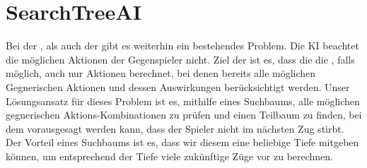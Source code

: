 \section{SearchTreeAI}
\label{sec:searchtree-ai}

Bei der , als auch der  gibt es weiterhin ein bestehendes
Problem.
Die \acs{KI} beachtet die möglichen Aktionen der Gegenspieler nicht.
Ziel der  ist es, dass die die , falls möglich, auch nur Aktionen berechnet,
bei denen bereits alle möglichen Gegnerischen Aktionen und dessen Auswirkungen berücksichtigt werden.
Unser Lösungsansatz für dieses Problem ist es, mithilfe eines Suchbaums, alle möglichen gegnerischen
Aktions-Kombinationen zu prüfen und einen Teilbaum zu finden, bei dem vorausgesagt werden kann, dass
der Spieler nicht im nächsten Zug stirbt.
Der Vorteil eines Suchbaums ist es, dass wir diesem eine
beliebige Tiefe mitgeben können, um entsprechend der Tiefe viele zukünftige Züge vor zu berechnen.
